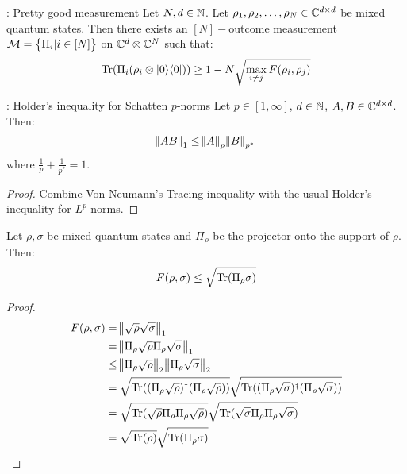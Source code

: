 \begin{lembox}{: Pretty good measurement}
    Let $N,d \in \mathbb{N}$. Let $\rho_1, \rho_2, \ldots, \rho_N \in \mathbb{C}^{d \times d}$ be mixed quantum states. Then there exists an $[N]-$outcome measurement $\mathcal{M} = \set{\Pi_i \vert i \in [N]}$ on $\mathbb{C}^d \otimes \mathbb{C}^N$ such that:
    \begin{equation}
        \mathrm{Tr}(\Pi_i  (\rho_i \otimes \lvert 0 \rangle \langle 0 \rvert)) \geq 1 - N\sqrt{\max_{i \neq j}F(\rho_i, \rho_j)}
    \end{equation}
\end{lembox}

\begin{lembox}{: Holder's inequality for Schatten $p$-norms}
    Let $p \in [1, \infty]$, $d \in \mathbb{N}$, $A, B \in \mathbb{C}^{d \times d}$. Then:
    \begin{equation}
        \norm{AB}_1 \leq \norm{A}_p\norm{B}_{p^*}
    \end{equation}
    where $\frac{1}{p} + \frac{1}{p^*} = 1$.
\end{lembox}
\begin{proof}
    Combine Von Neumann's Tracing inequality with the usual Holder's inequality for $L^p$ norms.
\end{proof}
\begin{lembox}{}
    Let $\rho, \sigma$ be mixed quantum states and $\Pi_\rho$ be the projector onto the support of $\rho$. Then:
    \begin{equation}
        F(\rho, \sigma) \leq \sqrt{\mathrm{Tr}(\Pi_\rho \sigma)}
    \end{equation}
\end{lembox}
\begin{proof}
    \begin{align*}
        F(\rho, \sigma) &= \norm{\sqrt{\rho}\sqrt{\sigma}}_1
        \\ &= \norm{\Pi_\rho \sqrt{\rho} \Pi_\rho\sqrt{\sigma}}_1
        \\ &\leq \norm{\Pi_\rho \sqrt{\rho}}_2 \norm{\Pi_\rho\sqrt{\sigma}}_2
        \\ &= \sqrt{\mathrm{Tr}((\Pi_\rho\sqrt{\rho})^\dagger (\Pi_\rho\sqrt{\rho}))} \sqrt{\mathrm{Tr}((\Pi_\rho\sqrt{\sigma})^\dagger (\Pi_\rho\sqrt{\sigma}))}
        \\ &= \sqrt{\mathrm{Tr}(\sqrt{\rho}\Pi_\rho \Pi_\rho \sqrt{\rho})}\sqrt{\mathrm{Tr}(\sqrt{\sigma}\Pi_\rho \Pi_\rho \sqrt{\sigma})}
        \\ &= \sqrt{\mathrm{Tr}(\rho)}\sqrt{\mathrm{Tr}(\Pi_\rho \sigma)}
    \end{align*}
\end{proof}
